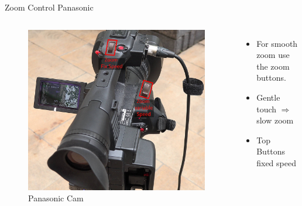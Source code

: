 \begin{frame}{Zoom Control Panasonic}
	\begin{columns}[T,onlytextwidth]
	\begin{figure}
		\centering
		\includegraphics[width=0.99\textwidth]{images/panasonic-zoom-annotated.jpg}
		\caption{Panasonic Cam}
	\end{figure}
		\begin{itemize}
			\item For smooth zoom use the zoom buttons.
			\item Gentle touch $\Rightarrow$ slow zoom
			\item Top Buttons fixed speed
		\end{itemize}
	\end{columns}
\end{frame}

